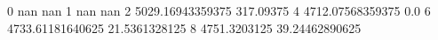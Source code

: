 0 nan nan
1 nan nan
2 5029.16943359375 317.09375
4 4712.07568359375 0.0
6 4733.61181640625 21.5361328125
8 4751.3203125 39.24462890625
